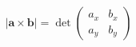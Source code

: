 \documentclass[preview]{standalone}
\begin{document}
\begin{align*}
|\mathbf{a} \times \mathbf{b}| = \det\begin{pmatrix} a_x & b_x \\ a_y & b_y \end{pmatrix}
\end{align*}
\end{document}
